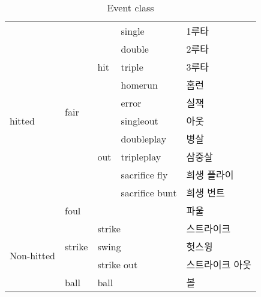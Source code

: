 \documentclass[twoside]{article}
\begin{document}
\begin{table}[]
\centering
\caption{Event class}
\label{my-label}
\begin{tabular}{|l|l|l|l|l|}
\hline
\multirow{11}{*}{hitted}    & \multirow{10}{*}{fair}  & \multirow{5}{*}{hit} & single         & 1루타 \\ \cline{4-5} 
                            &                         &                      & double         & 2루타   \\ \cline{4-5} 
                            &                         &                      & triple         & 3루타   \\ \cline{4-5} 
                            &                         &                      & homerun        & 홈런    \\ \cline{4-5} 
                            &                         &                      & error          & 실책    \\ \cline{3-5} 
                            &                         & \multirow{5}{*}{out} & singleout      & 아웃    \\ \cline{4-5} 
                            &                         &                      & doubleplay     & 병살    \\ \cline{4-5} 
                            &                         &                      & tripleplay     & 삼중살    \\ \cline{4-5} 
                            &                         &                      & sacrifice fly  & 희생 플라이    \\ \cline{4-5} 
                            &                         &                      & sacrifice bunt & 희생 번트    \\ \cline{2-5} 
                            & \multicolumn{3}{l|}{foul}                                       &  파울   \\ \hline
\multirow{7}{*}{Non-hitted} & \multirow{3}{*}{strike} & \multicolumn{2}{l|}{strike}           &  스트라이크   \\ \cline{3-5} 
                            &                         & \multicolumn{2}{l|}{swing}            &   헛스윙  \\ \cline{3-5} 
                            &                         & \multicolumn{2}{l|}{strike out}       &  스트라이크 아웃  \\ \cline{2-5} 
                            & \multirow{4}{*}{ball}   & \multicolumn{2}{l|}{ball}             &  볼   \\ \cline{3-5} 

\end{tabular}
\end{table}
\end{document}
